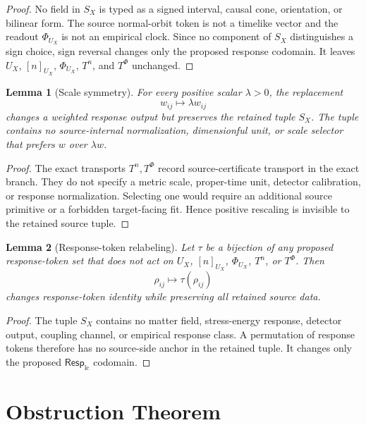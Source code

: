 \documentclass[11pt]{article}
\newcommand{\RespLC}{\mathsf{Resp}_{\mathrm{lc}}}
\newtheorem{lemma}{Lemma}
\begin{document}
\begin{proof}
No field in \(S_X\) is typed as a signed interval, causal cone,
orientation, or bilinear form. The source normal-orbit token is not a
timelike vector and the readout \(\Phi_{U_X}\) is not an empirical
clock. Since no component of \(S_X\) distinguishes a sign choice, sign
reversal changes only the proposed response codomain. It leaves
\(U_X\), \([n]_{U_X}\), \(\Phi_{U_X}\), \(T^n\), and \(T^\Phi\)
unchanged.
\end{proof}

\begin{lemma}[Scale symmetry]
For every positive scalar \(\lambda>0\), the replacement
\[
    w_{ij}\mapsto \lambda w_{ij}
\]
changes a weighted response output but preserves the retained tuple
\(S_X\). The tuple contains no source-internal normalization,
dimensionful unit, or scale selector that prefers \(w\) over
\(\lambda w\).
\end{lemma}

\begin{proof}
The exact transports \(T^n,T^\Phi\) record source-certificate
transport in the exact branch. They do not specify a metric scale,
proper-time unit, detector calibration, or response normalization.
Selecting one would require an additional source primitive or a
forbidden target-facing fit. Hence positive rescaling is invisible to
the retained source tuple.
\end{proof}

\begin{lemma}[Response-token relabeling]
Let \(\tau\) be a bijection of any proposed response-token set that
does not act on \(U_X\), \([n]_{U_X}\), \(\Phi_{U_X}\), \(T^n\), or
\(T^\Phi\). Then
\[
    \rho_{ij}\mapsto \tau(\rho_{ij})
\]
changes response-token identity while preserving all retained source
data.
\end{lemma}

\begin{proof}
The tuple \(S_X\) contains no matter field, stress-energy response,
detector output, coupling channel, or empirical response class. A
permutation of response tokens therefore has no source-side anchor in
the retained tuple. It changes only the proposed \(\RespLC\) codomain.
\end{proof}

\section{Obstruction Theorem}
\end{document}
